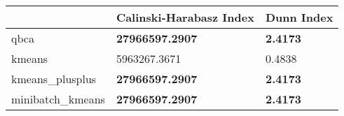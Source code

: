 \begin{table}[htbp]
\centering
\begin{tabular}{lll}
\toprule
 & Calinski-Harabasz Index & Dunn Index \\
\midrule
qbca & \textbf{27966597.2907} & \textbf{2.4173} \\
kmeans & 5963267.3671 & 0.4838 \\
kmeans_plusplus & \textbf{27966597.2907} & \textbf{2.4173} \\
minibatch_kmeans & \textbf{27966597.2907} & \textbf{2.4173} \\
\bottomrule
\end{tabular}
\end{table}

